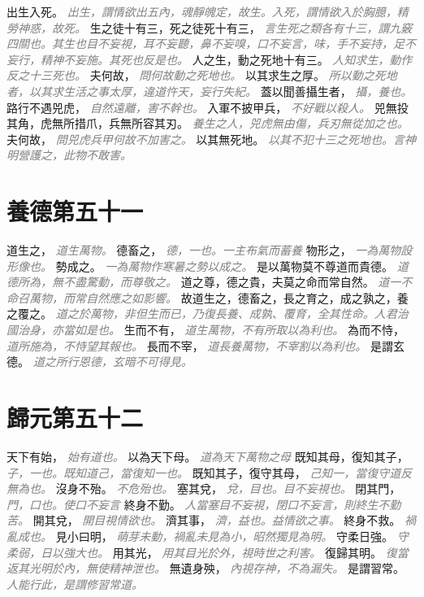 \documentclass[a4paper,zihao=-4,oneside,landscape,UTF8]{ctexart}
\newcommand{\zhushi}[1]{\scriptsize{\textit{\textcolor{gray}{#1}}}\normalsize}
\begin{document}
出生入死。
\zhushi{出生，謂情欲出五內，魂靜魄定，故生。入死，謂情欲入於胸臆，精勞神惑，故死。}
生之徒十有三，死之徒死十有三，
\zhushi{言生死之類各有十三，謂九竅四關也。其生也目不妄視，耳不妄聽，鼻不妄嗅，口不妄言，味，手不妄持，足不妄行，精神不妄施。其死也反是也。}
人之生，動之死地十有三。
\zhushi{人知求生，動作反之十三死也。}
夫何故，
\zhushi{問何故動之死地也。}
以其求生之厚。
\zhushi{所以動之死地者，以其求生活之事太厚，違道忤天，妄行失紀。}
蓋以聞善攝生者，
\zhushi{攝，養也。}
路行不遇兕虎，
\zhushi{自然遠離，害不幹也。}
入軍不披甲兵，
\zhushi{不好戰以殺人。}
兕無投其角，虎無所措爪，兵無所容其刃。
\zhushi{養生之人，兕虎無由傷，兵刃無從加之也。}
夫何故，
\zhushi{問兕虎兵甲何故不加害之。}
以其無死地。
\zhushi{以其不犯十三之死地也。言神明營護之，此物不敢害。}


\section{養德第五十一}

道生之，
\zhushi{道生萬物。}
德畜之，
\zhushi{德，一也。一主布氣而蓄養}
物形之，
\zhushi{一為萬物設形像也。}
勢成之。
\zhushi{一為萬物作寒暑之勢以成之。}
是以萬物莫不尊道而貴德。
\zhushi{道德所為，無不盡驚動，而尊敬之。}
道之尊，德之貴，夫莫之命而常自然。
\zhushi{道一不命召萬物，而常自然應之如影響。}
故道生之，德畜之，長之育之，成之孰之，養之覆之。
\zhushi{道之於萬物，非但生而已，乃復長養、成孰、覆育，全其性命。人君治國治身，亦當如是也。}
生而不有，
\zhushi{道生萬物，不有所取以為利也。}
為而不恃，
\zhushi{道所施為，不恃望其報也。}
長而不宰，
\zhushi{道長養萬物，不宰割以為利也。}
是謂玄德。
\zhushi{道之所行恩德，玄暗不可得見。}


\section{歸元第五十二}

天下有始，
\zhushi{始有道也。}
以為天下母。
\zhushi{道為天下萬物之母}
既知其母，復知其子，
\zhushi{子，一也。既知道己，當復知一也。}
既知其子，復守其母，
\zhushi{己知一，當復守道反無為也。}
沒身不殆。
\zhushi{不危殆也。}
塞其兌，
\zhushi{兌，目也。目不妄視也。}
閉其門，
\zhushi{門，口也。使口不妄言}
終身不勤。
\zhushi{人當塞目不妄視，閉口不妄言，則終生不勤苦。}
開其兌，
\zhushi{開目視情欲也。}
濟其事，
\zhushi{濟，益也。益情欲之事。}
終身不救。
\zhushi{禍亂成也。}
見小曰明，
\zhushi{萌芽未動，禍亂未見為小，昭然獨見為明。}
守柔日強。
\zhushi{守柔弱，日以強大也。}
用其光，
\zhushi{用其目光於外，視時世之利害。}
復歸其明。
\zhushi{復當返其光明於內，無使精神泄也。}
無遺身殃，
\zhushi{內視存神，不為漏失。}
是謂習常。
\zhushi{人能行此，是謂修習常道。}
\end{document}
